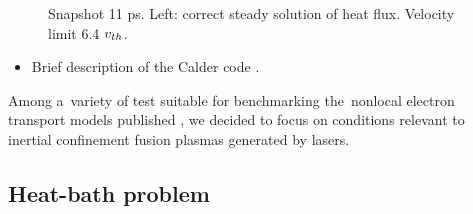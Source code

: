\begin{figure}[tbh]
\begin{center}
\begin{tabular}{c}
    \end{tabular}
  \caption{  
  Snapshot 11 ps. Left: correct steady solution of heat flux. 
  Velocity limit 6.4 $v_{th}$.
  }
  \label{fig:C7_Calder_case1}
  \end{center} 
\end{figure}

\begin{itemize}
  \item Brief description of the Calder code .
\end{itemize}


Among a~variety of test suitable for benchmarking the~nonlocal electron 
transport models published 
\cite{Epperlein_PoFB1991, marocchino2013, Sorbo_2015, 
Sorbo_2016, Sherlock_PoP2017, Brodrick_PoP2017}, we decided to focus on 
conditions relevant to inertial confinement fusion plasmas generated by lasers.

\subsection{Heat-bath problem}  
\label{sec:heatbath_test}

